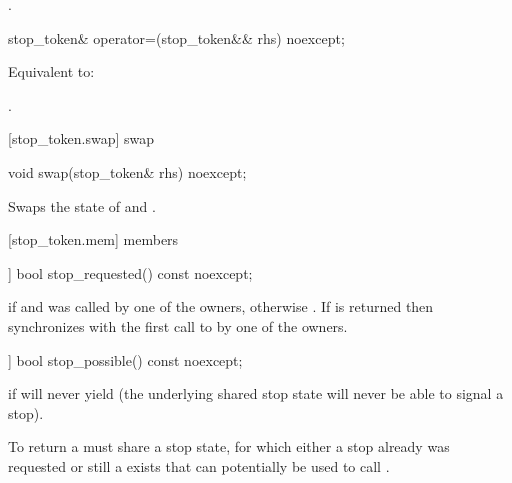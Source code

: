 {\begin{itemdescr}
  \pnum\returns {}.
\end{itemdescr}

%
\begin{itemdecl}
stop_token& operator=(stop_token&& rhs) noexcept;
\end{itemdecl}
\begin{itemdescr}
  \pnum\effects Equivalent to: 

  \pnum\returns {}.
\end{itemdescr}

[stop_token.swap]{ swap}

%
\begin{itemdecl}
void swap(stop_token& rhs) noexcept;
\end{itemdecl}

\begin{itemdescr}
\pnum
\effects Swaps the state of  and .
\end{itemdescr}


[stop_token.mem]{ members}

%
\begin{itemdecl}
[[nodiscard]] bool stop_requested() const noexcept;
\end{itemdecl}
\begin{itemdescr}
  \pnum\returns {} if  
                and  was called by one of the owners,
                otherwise .
  \pnum\sync If  is returned then synchronizes with the
             first call to  by one of the owners.
\end{itemdescr}

%
\begin{itemdecl}
[[nodiscard]] bool stop_possible() const noexcept;
\end{itemdecl}
\begin{itemdescr}
  \pnum\returns {} if  will never yield 
                (the underlying shared stop state will never be able to signal a stop).
                \begin{note}To return 
                  a  must share a stop state, for which either a stop already was requested
                  or still a  exists that can potentially
                  be used to call .
                \end{note}
\end{itemdescr}


}
